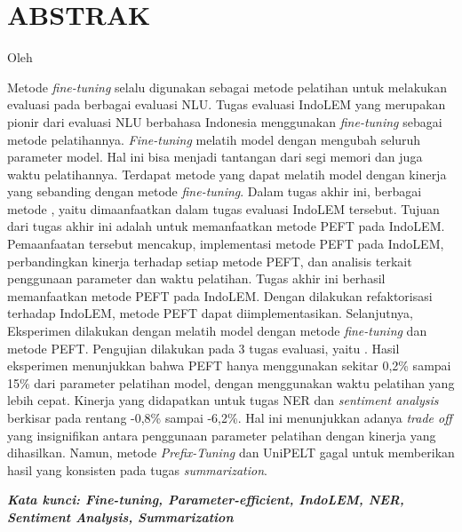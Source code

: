 \clearpage
\chapter*{ABSTRAK}

\begin{center}
    \center
    \begin{singlespace}
        \large\bfseries\MakeUppercase{\thetitle}
    
        \normalfont\normalsize
        Oleh
    
        \bfseries \theauthor
    \end{singlespace}
\end{center} 

\begin{singlespace}
    Metode \textit{fine-tuning} selalu digunakan sebagai metode pelatihan untuk melakukan evaluasi pada berbagai evaluasi NLU. Tugas evaluasi IndoLEM yang merupakan pionir dari evaluasi NLU berbahasa Indonesia menggunakan \textit{fine-tuning} sebagai metode pelatihannya. \textit{Fine-tuning} melatih model dengan mengubah seluruh parameter model. Hal ini bisa menjadi tantangan dari segi memori dan juga waktu pelatihannya. Terdapat metode \PEFT yang dapat melatih model dengan kinerja yang sebanding dengan metode \textit{fine-tuning}. Dalam tugas akhir ini, berbagai metode \PEFT, yaitu \methodPEFT dimaanfaatkan dalam tugas evaluasi IndoLEM tersebut. Tujuan dari tugas akhir ini adalah untuk memanfaatkan metode PEFT pada IndoLEM. Pemaanfaatan tersebut mencakup, implementasi metode PEFT pada IndoLEM, perbandingkan kinerja terhadap setiap metode PEFT, dan analisis terkait penggunaan parameter dan waktu pelatihan.
    Tugas akhir ini berhasil memanfaatkan metode PEFT pada IndoLEM. Dengan dilakukan refaktorisasi terhadap IndoLEM, metode PEFT dapat diimplementasikan. Selanjutnya, Eksperimen dilakukan dengan melatih model dengan metode \textit{fine-tuning} dan metode PEFT. Pengujian dilakukan pada 3 tugas evaluasi, yaitu \nlptask. Hasil eksperimen menunjukkan bahwa PEFT hanya menggunakan sekitar 0,2\% sampai 15\% dari parameter pelatihan model, dengan menggunakan waktu pelatihan yang lebih cepat. Kinerja yang didapatkan untuk tugas NER dan \textit{sentiment analysis} berkisar pada rentang -0,8\% sampai -6,2\%. Hal ini menunjukkan adanya \textit{trade off} yang insignifikan antara penggunaan parameter pelatihan dengan kinerja yang dihasilkan. Namun, metode \textit{Prefix-Tuning} dan UniPELT gagal untuk memberikan hasil yang konsisten pada tugas \textit{summarization}.

    \textit{\textbf{Kata kunci: Fine-tuning, Parameter-efficient, IndoLEM, NER, Sentiment Analysis, Summarization}}
\end{singlespace}

\clearpage
